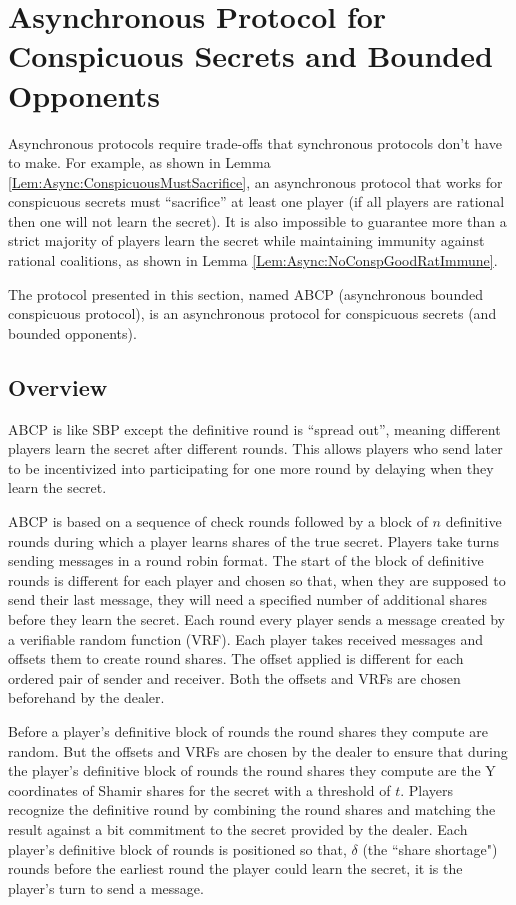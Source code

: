 \documentclass{dalcsthesis}
\begin{document}
\section{Asynchronous Protocol for Conspicuous Secrets and Bounded Opponents}

Asynchronous protocols require trade-offs that synchronous protocols don't have to make. For example, as shown in Lemma \ref{Lem:Async:ConspicuousMustSacrifice}, an asynchronous protocol that works for conspicuous secrets must ``sacrifice'' at least one player (if all players are rational then one will not learn the secret). It is also impossible to guarantee more than a strict majority of players learn the secret while maintaining immunity against rational coalitions, as shown in Lemma \ref{Lem:Async:NoConspGoodRatImmune}.

The protocol presented in this section, named ABCP (asynchronous bounded conspicuous protocol), is an asynchronous protocol for conspicuous secrets (and bounded opponents).

\subsection{Overview}

ABCP is like SBP except the definitive round is ``spread out'', meaning different players learn the secret after different rounds. This allows players who send later to be incentivized into participating for one more round by delaying when they learn the secret.
 
ABCP is based on a sequence of check rounds followed by a block of $n$ definitive rounds during which a player learns shares of the true secret. Players take turns sending messages in a round robin format. The start of the block of definitive rounds is different for each player and chosen so that, when they are supposed to send their last message, they will need a specified number of additional shares before they learn the secret. Each round every player sends a message created by a verifiable random function (VRF). Each player takes received messages and offsets them to create round shares. The offset applied is different for each ordered pair of sender and receiver. Both the offsets and VRFs are chosen beforehand by the dealer.

Before a player's definitive block of rounds the round shares they compute are random. But the offsets and VRFs are chosen by the dealer to ensure that during the player's definitive block of rounds the round shares they compute are the Y coordinates of Shamir shares for the secret with a threshold of $t$. Players recognize the definitive round by combining the round shares and matching the result against a bit commitment to the secret provided by the dealer. Each player's definitive block of rounds is positioned so that, $\delta$ (the ``share shortage") rounds before the earliest round the player could learn the secret, it is the player's turn to send a message.
\end{document}

